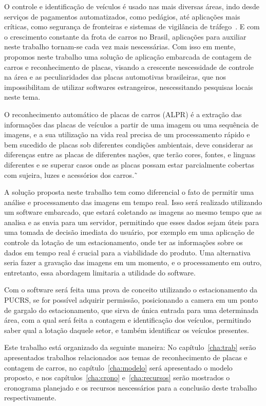 
O controle e identificação de veículos é usado nas mais diversas áreas, indo
desde serviços de pagamentos automatizados, como pedágios, até aplicações mais
críticas, como segurança de fronteiras e sistemas de vigilância de
tráfego~\cite{ahmad2015automatic}. E com o crescimento constante da frota de
carros no Brasil, aplicações para auxiliar neste trabalho tornam-se cada vez
mais nescessárias.  Com isso em mente, propomos neste trabalho uma solução de
aplicação embarcada de contagem de carros e reconhecimento de placas, visando a
crescente nescessidade de controle na área e as peculiaridades das placas
automotivas brasileiras, que nos impossibilitam de utilizar softwares
estrangeiros, nescessitando pesquisas locais neste tema.

O reconhecimento automático de placas de carros (ALPR) é a extração das informações
das placas de veículos a partir de uma imagem ou uma sequência de imagens, e a sua
utilização na vida real precisa de um processamento rápido e bem sucedido de placas 
sob diferentes condições ambientais, deve considerar as diferenças entre as placas
de diferentes nações, que terão cores, fontes, e linguas diferentes e se superar casos
onde as placas possam estar parcialmente cobertas com sujeira, luzes e acessórios dos 
carros.˜\cite{s2013automatic}

A solução proposta neste trabalho tem como diferencial o fato de permitir uma
análise e processamento das imagens em tempo real. Isso será realizado utilizando
um software embarcado, que estará coletando as imagens ao mesmo tempo que as analisa
e as envia para um servidor, permitindo que esses dados sejam úteis para uma tomada
de decisão imediata do usuário, por exemplo em uma aplicação de controle da lotação
de um estacionamento, onde ter as informações sobre os dados em tempo real é crucial
para a viabilidade do produto. Uma alternativa seria fazer a gravação das imagens em um 
momento, e o processamento em outro, entretanto, essa abordagem limitaria a utilidade do 
software.

Com o software será feita uma prova de conceito utilizando o estacionamento da
PUCRS, se for possível adquirir permissão, posicionando a camera em um ponto de
gargalo do estacionamento, que sirva de única entrada para uma determinada área,
com a qual será feita a contagem e identificação dos veículos, permitindo saber
qual a lotação daquele setor, e também identificar os veículos presentes.

Este trabalho está organizado da seguinte maneira: No capítulo~\ref{cha:trab}
serão apresentados trabalhos relacionados aos temas de reconhecimento de placas
e contagem de carros, no capítulo~\ref{cha:modelo} será apresentado o modelo
proposto, e nos capítulos~\ref{cha:crono}  e~\ref{cha:recursos} serão mostrados
o cronograma planejado e os recursos nescessários para a conclusão deste
trabalho respectivamente.

